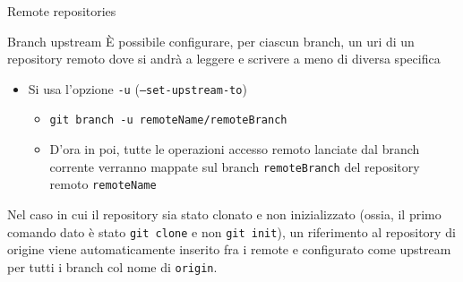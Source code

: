 \documentclass[presentation]{beamer}
\begin{document}
\begin{frame}{Remote repositories}
	\begin{block}{Branch upstream}
		È possibile configurare, per ciascun branch, un uri di un repository remoto dove si andrà a leggere e scrivere a meno di diversa specifica
		\begin{itemize}
			\item Si usa l'opzione \texttt{-u} (\texttt{--set-upstream-to})
			\begin{itemize}
				\item \texttt{git branch -u remoteName/remoteBranch}
				\item D'ora in poi, tutte le operazioni accesso remoto lanciate dal branch corrente verranno mappate sul branch \texttt{remoteBranch} del repository remoto \texttt{remoteName}
			\end{itemize}
		\end{itemize}
		Nel caso in cui il repository sia stato clonato e non inizializzato (ossia, il primo comando dato è stato \texttt{git clone} e non \texttt{git init}), un riferimento al repository di origine viene automaticamente inserito fra i remote e configurato come upstream per tutti i branch col nome di \texttt{origin}.

\end{block}
\end{frame}
\end{document}
